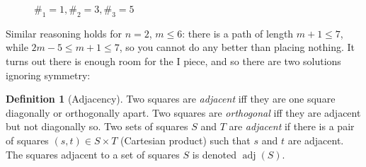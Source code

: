 \documentclass{article}
\theoremstyle{definition}%
\newtheorem{definition}[theorem]{Definition}
\newcommand{\newterm}[1]{\textit{#1}}
\newcommand{\adj}{\operatorname{adj}}
\begin{document}
\begin{figure}[htbp]
    \centering
    \caption{$\#_1 = 1, \#_2 = 3, \#_3 = 5$ \cite{v1}}
    \label{fig:no123}
\end{figure}

Similar reasoning holds for $n = 2$, $m \le 6$: there is a path of length $m + 1 \le 7$, while $2m - 5 \le m + 1 \le 7$, so you cannot do any better than placing nothing. It turns out there is enough room for the I piece, and so there are two solutions ignoring symmetry:

\begin{figure}[!h]
    \centering
    \label{fig:no2x5}
\end{figure}

\begin{definition}[Adjacency]
Two squares are \newterm{adjacent} iff they are one square diagonally or orthogonally apart. Two squares are \newterm{orthogonal} iff they are adjacent but not diagonally so. Two sets of squares $S$ and $T$ are \newterm{adjacent} if there is a pair of squares $(s, t) \in S \times T$ (Cartesian product) such that $s$ and $t$ are adjacent. The squares adjacent to a set of squares $S$ is denoted $\adj(S)$.
\end{definition}
\end{document}
